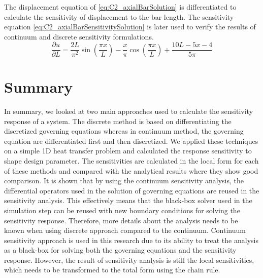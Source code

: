 %
The displacement equation of \eqref{eq:C2_axialBarSolution} is differentiated to calculate the sensitivity of displacement to the bar length. The sensitivity equation \eqref{eq:C2_axialBarSensitivitySolution} is later used to verify the results of continuum and discrete sensitivity formulations.
%
\begin{equation}\label{eq:C2_axialBarSensitivitySolution}
    \dfrac{\partial u}{\partial L} = 
    \dfrac{2L}{\pi^2} \sin \left( \frac{\pi x}{L} \right) - 
    \dfrac{x}{\pi} \cos \left( \frac{\pi x}{L} \right) + 
    \dfrac{10L - 5x - 4}{5 \pi}
\end{equation}
%


\section{Summary}
In summary, we looked at two main approaches used to calculate the sensitivity response of a system. The discrete method is based on differentiating the discretized governing equations whereas in continuum method, the governing equation are differentiated first and then discretized. We applied these techniques on a simple 1D heat transfer problem and calculated the response sensitivity to shape design parameter. The sensitivities are calculated in the local form for each of these methods and compared with the analytical results where they show good comparison. It is shown that by using the continuum sensitivity analysis, the differential operators used in the solution of governing equations are reused in the sensitivity analysis. This effectively means that the black-box solver used in the simulation step can be reused with new boundary conditions for solving the sensitivity response. %
Therefore, more details about the analysis needs to be known when using discrete approach compared to the continuum. Continuum sensitivity approach is used in this research due to its ability to treat the analysis as a black-box for solving both the governing equations and the sensitivity response. However, the result of sensitivity analysis is still the local sensitivities, which needs to be transformed to the total form using the chain rule. %